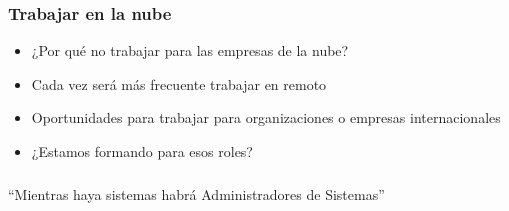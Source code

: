 \documentclass[aspectratio=169]{beamer}
\begin{document}
\begin{frame}
  \frametitle{Trabajar en la nube}
  \begin{itemize}
  \item ¿Por qué no trabajar para las empresas de la nube?
  \item Cada vez será más frecuente trabajar en remoto
  \item Oportunidades para trabajar para organizaciones o empresas internacionales
  \item ¿Estamos formando para esos roles?
  \end{itemize}
\end{frame}

\begin{frame}
  \frametitle{}
  \begin{center}
    ``Mientras haya sistemas habrá Administradores de Sistemas''
  \end{center}
\end{frame}
\end{document}
